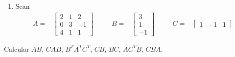 \documentclass[
]{article}
\providecommand{\tightlist}{%
  \setlength{\itemsep}{0pt}\setlength{\parskip}{0pt}}
\begin{document}
\begin{enumerate}
\def\labelenumi{\arabic{enumi}.}
\setcounter{enumi}{7}
\tightlist
\item
  Sean \begin{equation*}
  \begin{array}{cccccccc}
  A= & 
    \begin{bmatrix} 
   2  & 1 & 2 \\ 
   0  & 3 & -1 \\
   4  & 1 & 1
    \end{bmatrix}   & \,\,\,\,\,\, & 
  B = &  \begin{bmatrix} 
   3   \\ 
   1   \\
   -1  
    \end{bmatrix} & \,\,\,\,\,\, &
  C= & \begin{bmatrix} 
   1  & -1 & 1
    \end{bmatrix}
  \end{array}
  \end{equation*}
\end{enumerate}

Calcular \(AB\), \(CAB\), \(B^{T}A^{T}C^{T}\), \(CB\), \(BC\),
\(AC^{T}B\), \(CBA\).
\end{document}
